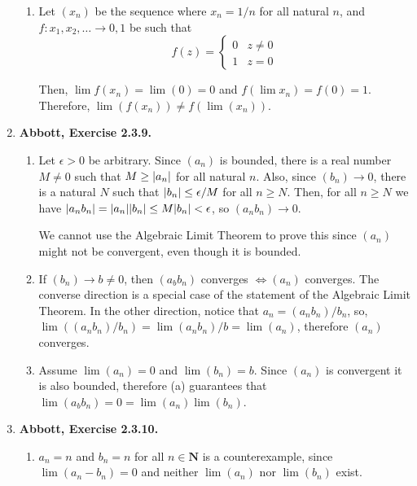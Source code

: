 \documentclass{article}
\DeclarePairedDelimiter\abs{\lvert}{\rvert}
\newcommand{\N}{\mathbf{N}}
\newcommand{\exc}[2][Abbott]{\item \textbf{#1, Exercise #2.}}
\begin{document}
\begin{enumerate}
\begin{enumerate}
		\item Let $(x_n)$ be the sequence where $x_n = 1/n$ for all natural $n$, and $f : {x_1, x_2, \dots} \rightarrow {0, 1}$ be such that \begin{equation*}
		      f(z) = \begin{cases}
		      0 & z \neq 0 \\
		      1 & z = 0
		\end{cases}
		\end{equation*}
						            
		Then, $\lim f(x_n) = \lim (0) = 0$ and $f(\lim x_n) = f(0) = 1$. Therefore, $\lim (f(x_n)) \neq f(\lim(x_n))$.
	\end{enumerate}
			        
	\exc{2.3.9}
	\begin{enumerate}
		\item Let $\epsilon > 0$ be arbitrary. Since $(a_n)$ is bounded, there is a real number $M \neq 0$ such that $M \geq \abs*{a_n}$ for all natural $n$. Also, since $(b_n) \rightarrow 0$, there is a natural $N$ such that $\abs*{b_n} \leq \epsilon/M$ for all $n \geq N$. Then, for all $n \geq N$ we have $\abs*{a_n b_n} = \abs*{a_n} \abs*{b_n} \leq M \abs*{b_n} < \epsilon$, so $(a_n b_n) \rightarrow 0$.
		      		      		      	        
		      We cannot use the Algebraic Limit Theorem to prove this since $(a_n)$ might not be convergent, even though it is bounded.
		      		      		      	        
		\item If $(b_n) \rightarrow b \neq 0$, then $(a_b b_n)$ converges $\iff (a_n)$ converges. The converse direction is a special case of the statement of the Algebraic Limit Theorem. In the other direction, notice that $a_n = (a_n b_n) / b_n$, so, $\lim ((a_n b_n) / b_n) = \lim(a_n b_n) / b = \lim (a_n)$, therefore $(a_n)$ converges.
		      		      		      	        
		\item Assume $\lim (a_n) = 0$ and $\lim (b_n) = b$. Since $(a_n)$ is convergent it is also bounded, therefore (a) guarantees that $\lim(a_b b_n) = 0 = \lim(a_n) \lim(b_n)$.
	\end{enumerate}
				    
	\exc{2.3.10}
	\begin{enumerate}
		\item $a_n = n$ and $b_n = n$ for all $n \in \N$ is a counterexample, since $\lim (a_n - b_n) = 0$ and neither $\lim(a_n)$ nor $\lim(b_n)$ exist.
		      		      		      	     

\end{enumerate}
\end{enumerate}
\end{document}
